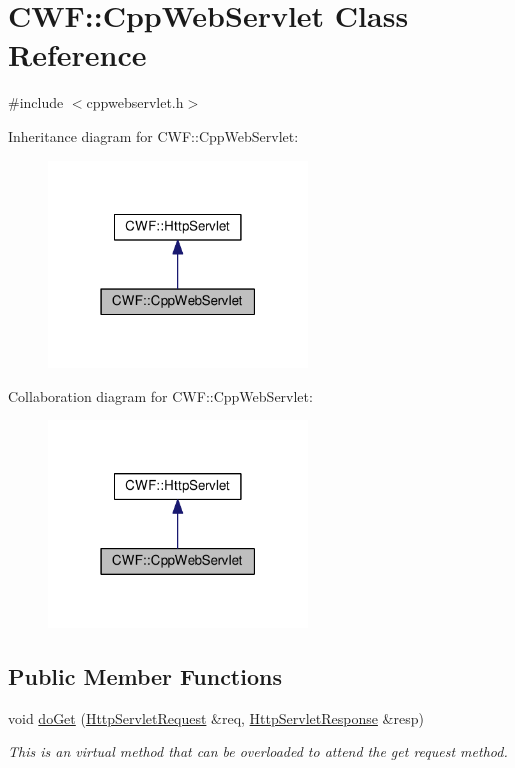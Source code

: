 \hypertarget{class_c_w_f_1_1_cpp_web_servlet}{\section{C\+W\+F\+:\+:Cpp\+Web\+Servlet Class Reference}
\label{class_c_w_f_1_1_cpp_web_servlet}
}


{\ttfamily \#include $<$cppwebservlet.\+h$>$}



Inheritance diagram for C\+W\+F\+:\+:Cpp\+Web\+Servlet\+:
\nopagebreak
\begin{figure}[H]
\begin{center}
\leavevmode
\includegraphics[width=195pt]{class_c_w_f_1_1_cpp_web_servlet__inherit__graph}
\end{center}
\end{figure}


Collaboration diagram for C\+W\+F\+:\+:Cpp\+Web\+Servlet\+:
\nopagebreak
\begin{figure}[H]
\begin{center}
\leavevmode
\includegraphics[width=195pt]{class_c_w_f_1_1_cpp_web_servlet__coll__graph}
\end{center}
\end{figure}
\subsection*{Public Member Functions}
\begin{DoxyCompactItemize}
\item 
void \hyperlink{class_c_w_f_1_1_cpp_web_servlet_abccb89389697d9c6837e589cf7af02b6}{do\+Get} (\hyperlink{class_c_w_f_1_1_http_servlet_request}{Http\+Servlet\+Request} \&req, \hyperlink{class_c_w_f_1_1_http_servlet_response}{Http\+Servlet\+Response} \&resp)
\begin{DoxyCompactList}\small\item\em This is an virtual method that can be overloaded to attend the get request method. \end{DoxyCompactList}\end{DoxyCompactItemize}


